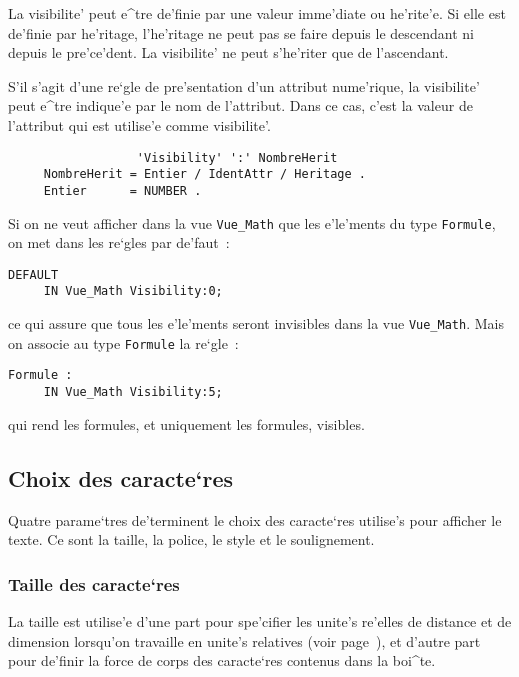 {La visibilite' peut e^tre de'finie par une valeur imme'diate ou he'rite'e.
Si elle est de'finie par he'ritage, l'he'ritage ne peut pas se faire depuis
le descendant ni depuis le pre'ce'dent. La visibilite' ne peut s'he'riter que de
l'ascendant.

S'il s'agit d'une re`gle de pre'sentation d'un attribut nume'rique, la visibilite'
peut e^tre indique'e par le nom de l'attribut. Dans ce cas, c'est la valeur de
l'attribut qui est utilise'e comme visibilite'.

\begin{verbatim}
                  'Visibility' ':' NombreHerit
     NombreHerit = Entier / IdentAttr / Heritage .
     Entier      = NUMBER .
\end{verbatim}

\begin{example}
Si on ne veut afficher dans la vue {\tt Vue\_Math} que les e'le'ments
du type {\tt Formule}, on met dans les re`gles par de'faut~:

\begin{verbatim}
DEFAULT
     IN Vue_Math Visibility:0;
\end{verbatim}
ce qui assure que tous les e'le'ments seront invisibles dans la vue
{\tt Vue\_Math}. Mais on associe au type {\tt Formule} la re`gle~:

\begin{verbatim}
Formule :
     IN Vue_Math Visibility:5;
\end{verbatim}

qui rend les formules, et uniquement les formules, visibles.

\end{example}

\subsection{Choix des caracte`res}

Quatre parame`tres de'terminent le choix des caracte`res utilise's
pour afficher 
le texte. Ce sont la taille, la police, le style et le soulignement.

\subsubsection{Taille des caracte`res}

La taille est utilise'e d'une part pour spe'cifier les unite's re'elles de
distance et de dimension lorsqu'on travaille en unite's relatives (voir
page~\pageref{unites}), et d'autre part pour de'finir la force de corps des
caracte`res contenus dans la boi^te.

}
